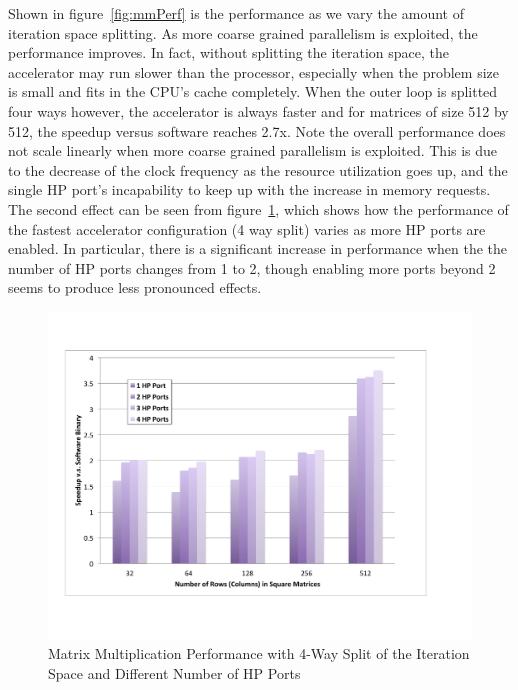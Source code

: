 Shown in figure~\ref{fig:mmPerf} is the performance as we vary the amount of iteration space splitting. As more coarse grained parallelism is exploited, the performance improves. In fact, without splitting the iteration space, the accelerator may run slower than the processor, especially when the problem size is small and fits in the CPU's cache completely. When the outer loop is splitted four ways however, the accelerator is always faster and for matrices of size 512 by 512, the speedup versus software reaches 2.7x. Note the overall performance does not scale linearly when more coarse grained parallelism is exploited. This is due to the decrease of the clock frequency as the resource utilization goes up, and the single HP port's incapability to keep up with the increase in memory requests. The second effect can be seen from figure~\ref{fig:mmPorts}, which shows how the performance of the fastest accelerator configuration (4 way split) varies as more HP ports are enabled. %
In particular, there is a significant increase in performance when the the number of HP ports changes from 1 to 2, though enabling more ports beyond 2 seems to produce less pronounced effects. 

\begin{figure}[htp]
\begin{center}
\includegraphics[width=1.0\linewidth]{chap6fig/mmPortPerf.pdf}
\caption{Matrix Multiplication Performance with 4-Way Split of the Iteration Space and Different Number of HP Ports
\label{fig:mmPorts}}
\end{center}
\end{figure}


